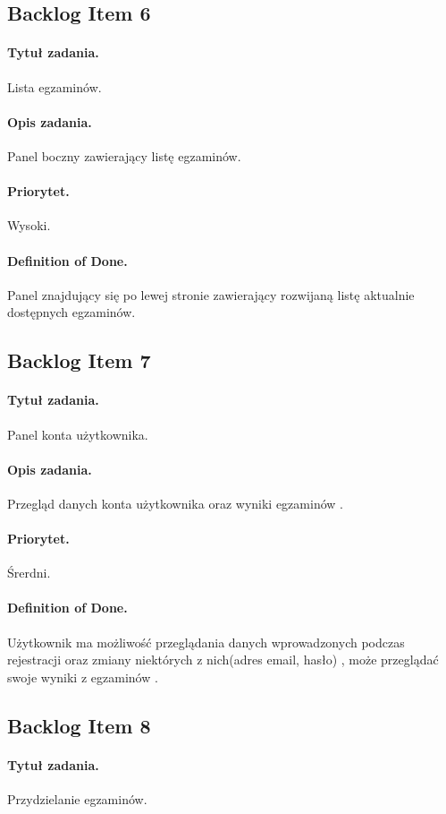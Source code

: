 \documentclass[a4paper]{article}
\begin{document}
\subsection{Backlog Item 6}
\paragraph{Tytuł zadania.} Lista egzaminów.
\paragraph{Opis zadania.} Panel boczny zawierający listę egzaminów.
\paragraph{Priorytet.} Wysoki.
\paragraph{Definition of Done.} Panel znajdujący się po lewej stronie zawierający rozwijaną listę aktualnie dostępnych egzaminów.

\subsection{Backlog Item 7}
\paragraph{Tytuł zadania.} Panel konta użytkownika.
\paragraph{Opis zadania.} Przegląd danych konta użytkownika oraz wyniki egzaminów .
\paragraph{Priorytet.} Śrerdni.
\paragraph{Definition of Done.} Użytkownik ma możliwość przeglądania danych wprowadzonych podczas rejestracji oraz zmiany niektórych z nich(adres email, hasło) , może przeglądać swoje wyniki z egzaminów .

\subsection{Backlog Item 8}
\paragraph{Tytuł zadania.} Przydzielanie egzaminów.
\end{document}
